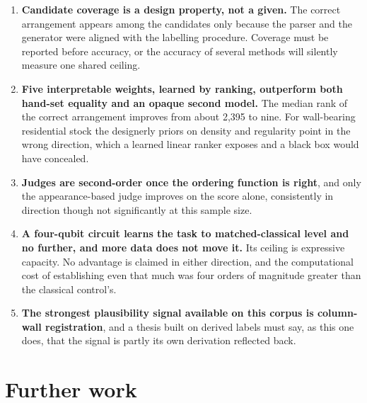 \begin{enumerate}
\item \textbf{Candidate coverage is a design property, not a given.} The
correct arrangement appears among the candidates only because the parser
and the generator were aligned with the labelling procedure. Coverage must
be reported before accuracy, or the accuracy of several methods will
silently measure one shared ceiling.

\item \textbf{Five interpretable weights, learned by ranking, outperform
both hand-set equality and an opaque second model.} The median rank of the
correct arrangement improves from about 2,395 to nine. For wall-bearing
residential stock the designerly priors on density and regularity point in
the wrong direction, which a learned linear ranker exposes and a black box
would have concealed.

\item \textbf{Judges are second-order once the ordering function is
right}, and only the appearance-based judge improves on the score alone,
consistently in direction though not significantly at this sample size.

\item \textbf{A four-qubit circuit learns the task to matched-classical
level and no further, and more data does not move it.} Its ceiling is
expressive capacity. No advantage is claimed in either direction, and the
computational cost of establishing even that much was four orders of
magnitude greater than the classical control's.

\item \textbf{The strongest plausibility signal available on this corpus
is column-wall registration}, and a thesis built on derived labels must
say, as this one does, that the signal is partly its own derivation
reflected back.
\end{enumerate}

\section{Further work}
\label{sec:further}

